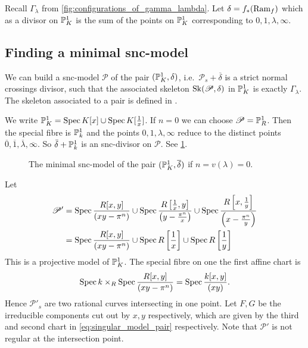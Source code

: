 Recall $\Gamma_\lambda$ from \cref{fig:configurations_of_gamma_lambda}. 
Let $\delta = f_* (\operatorname{Ram}_f)$ which as a divisor on $\mathbb{P}^{1}_K$ is the sum of the points on $\mathbb{P}^{1}_K$ corresponding to $0, 1, \lambda, \infty$. 
\subsection{Finding a minimal snc-model} \label{sec:finding_a_minimal_snc_model}
We can build a snc-model $\mathscr P$ of the pair $(\mathbb{P}^{1}_K, \delta)$, i.e.\ $\mathscr P_s + \overline{\delta}$ is a strict normal crossings divisor, such that the associated skeleton $\operatorname{Sk}(\mathscr P, \delta)$ in $\mathbb{P}^{1}_K$ is exactly $\Gamma_\lambda$. 
The skeleton associated to a pair is defined in \cite[§3.2.1]{bakerWeightFunctionsBerkovich2016}.

We write $\mathbb{P}^{1}_K = \operatorname{Spec} K[x] \cup \operatorname{Spec} K[\frac{1}{x}]$.
If $n = 0$ we can choose $\mathscr P = \mathbb{P}^{1}_R$. Then the special fibre is $\mathbb{P}^{1}_k$ and the points $0, 1, \lambda, \infty$ reduce to the distinct points $\overline{0}, \overline{1}, \overline{\lambda}, \overline{\infty}$.
So $\bar{\delta} + \mathbb{P}^{1}_k$ is an snc-divisor on $\mathscr P$. 
See \cref{fig:model_pair_n_1}. 
\begin{figure}[h]
    \centering
    \caption{The minimal snc-model of the pair $(\mathbb{P}^{1}_K, \overline{\delta})$ if $n =v(\lambda) = 0$.}
    \label{fig:model_pair_n_1}
\end{figure}

Let 
\begin{align}\label{eq:singular_model_pair}
	\mathscr P' &= \operatorname{Spec} \frac{R[x, y]}{(xy - \pi^{n})} \cup \operatorname{Spec} \frac{R\left[ \frac{1}{x},y \right]}{\left(y-\frac{\pi^{n}}{x}\right)} \cup \operatorname{Spec} \frac{R\left[x, \frac{1}{y}\right]}{\left(x - \frac{\pi^{n}}{y}\right)} \\
	&=  \operatorname{Spec} \frac{R[x, y]}{(xy - \pi^{n})} \cup \operatorname{Spec} R\left[ \frac{1}{x} \right] \cup \operatorname{Spec} R\left[ \frac{1}{y}\right] \nonumber 
 \end{align} 
This is a projective model of $\mathbb{P}^{1}_K$. 
The special fibre on one the first affine chart is \[
	\operatorname{Spec} k \times _{R} \operatorname{Spec} \frac{R[x, y]}{(xy -\pi^{n})}=\operatorname{Spec}  \frac{k[x, y]}{(xy)}
.\] 
Hence $\mathscr P'_s$ are two rational curves intersecting in one point. 
Let $F, G$ be the irreducible components cut out by $x, y$ respectively, which are given by the third and second chart in \eqref{eq:singular_model_pair} respectively. 
Note that $\mathscr P'$ is not regular at the intersection point.

